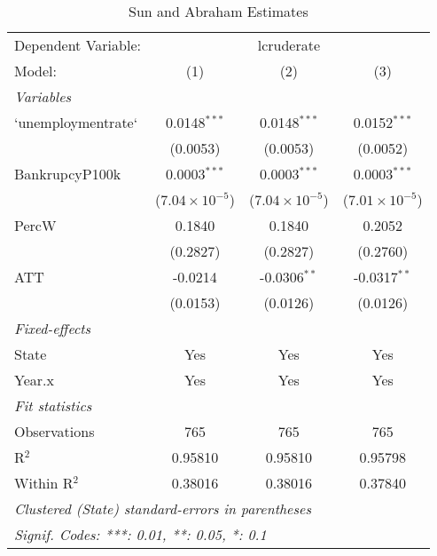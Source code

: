 
\begin{table}[htbp]
   \caption{Sun and Abraham Estimates}
   \centering
   \begin{tabular}{lccc}
      \tabularnewline \midrule \midrule
      Dependent Variable: & \multicolumn{3}{c}{lcruderate}\\
      Model:             & (1)                     & (2)                     & (3)\\  
      \midrule
      \emph{Variables}\\
      `unemploymentrate` & 0.0148$^{***}$          & 0.0148$^{***}$          & 0.0152$^{***}$\\   
                         & (0.0053)                & (0.0053)                & (0.0052)\\   
      BankrupcyP100k     & 0.0003$^{***}$          & 0.0003$^{***}$          & 0.0003$^{***}$\\   
                         & ($7.04\times 10^{-5}$)  & ($7.04\times 10^{-5}$)  & ($7.01\times 10^{-5}$)\\    
      PercW              & 0.1840                  & 0.1840                  & 0.2052\\   
                         & (0.2827)                & (0.2827)                & (0.2760)\\   
      ATT                & -0.0214                 & -0.0306$^{**}$          & -0.0317$^{**}$\\   
                         & (0.0153)                & (0.0126)                & (0.0126)\\   
      \midrule
      \emph{Fixed-effects}\\
      State              & Yes                     & Yes                     & Yes\\  
      Year.x             & Yes                     & Yes                     & Yes\\  
      \midrule
      \emph{Fit statistics}\\
      Observations       & 765                     & 765                     & 765\\  
      R$^2$              & 0.95810                 & 0.95810                 & 0.95798\\  
      Within R$^2$       & 0.38016                 & 0.38016                 & 0.37840\\  
      \midrule \midrule
      \multicolumn{4}{l}{\emph{Clustered (State) standard-errors in parentheses}}\\
      \multicolumn{4}{l}{\emph{Signif. Codes: ***: 0.01, **: 0.05, *: 0.1}}\\
   \end{tabular}
\end{table}


